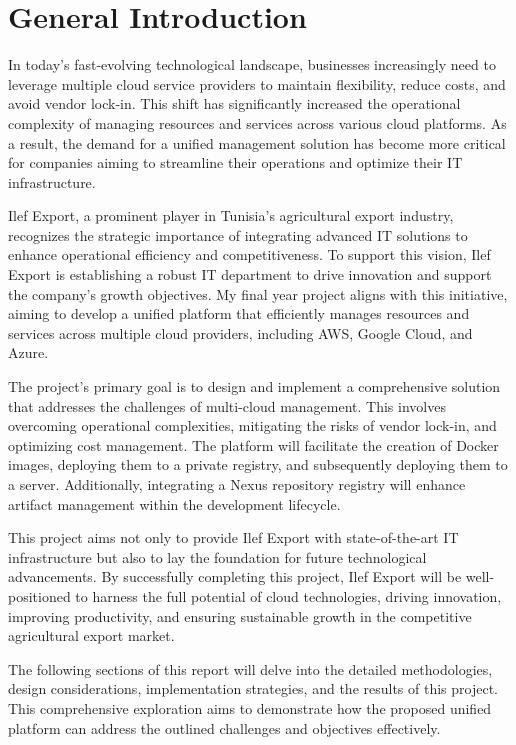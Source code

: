 \chapter*{General Introduction}
In today’s fast-evolving technological landscape, businesses increasingly need to leverage multiple cloud service providers to maintain flexibility, reduce costs, and avoid vendor lock-in. This shift has significantly increased the operational complexity of managing resources and services across various cloud platforms. As a result, the demand for a unified management solution has become more critical for companies aiming to streamline their operations and optimize their IT infrastructure.

Ilef Export, a prominent player in Tunisia's agricultural export industry, recognizes the strategic importance of integrating advanced IT solutions to enhance operational efficiency and competitiveness. To support this vision, Ilef Export is establishing a robust IT department to drive innovation and support the company’s growth objectives. My final year project aligns with this initiative, aiming to develop a unified platform that efficiently manages resources and services across multiple cloud providers, including AWS, Google Cloud, and Azure.

The project's primary goal is to design and implement a comprehensive solution that addresses the challenges of multi-cloud management. This involves overcoming operational complexities, mitigating the risks of vendor lock-in, and optimizing cost management. The platform will facilitate the creation of Docker images, deploying them to a private registry, and subsequently deploying them to a server. Additionally, integrating a Nexus repository registry will enhance artifact management within the development lifecycle.

This project aims not only to provide Ilef Export with state-of-the-art IT infrastructure but also to lay the foundation for future technological advancements. By successfully completing this project, Ilef Export will be well-positioned to harness the full potential of cloud technologies, driving innovation, improving productivity, and ensuring sustainable growth in the competitive agricultural export market.

The following sections of this report will delve into the detailed methodologies, design considerations, implementation strategies, and the results of this project. This comprehensive exploration aims to demonstrate how the proposed unified platform can address the outlined challenges and objectives effectively.
